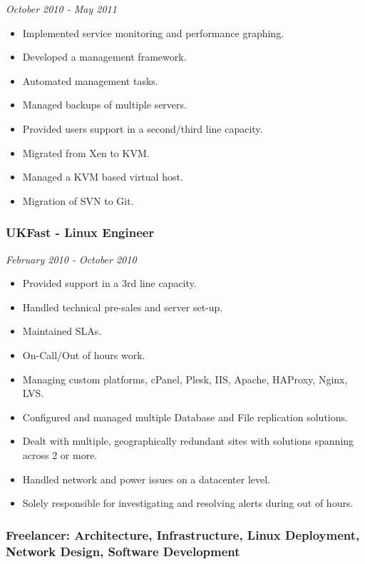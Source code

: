 \emph{October 2010 - May 2011}

\begin{itemize}
\itemsep1pt\parskip0pt
\item
  Implemented service monitoring and performance graphing.
\item
  Developed a management framework.
\item
  Automated management tasks.
\item
  Managed backups of multiple servers.
\item
  Provided users support in a second/third line capacity.
\item
  Migrated from Xen to KVM.
\item
  Managed a KVM based virtual host.
\item
  Migration of SVN to Git.
\end{itemize}

\subsubsection{UKFast - Linux Engineer}\label{ukfast---linux-engineer}

\emph{February 2010 - October 2010}

\begin{itemize}
\itemsep1pt\parskip0pt
\item
  Provided support in a 3rd line capacity.
\item
  Handled technical pre-sales and server set-up.
\item
  Maintained SLAs.
\item
  On-Call/Out of hours work.
\item
  Managing custom platforms, cPanel, Plesk, IIS, Apache, HAProxy, Nginx,
  LVS.
\item
  Configured and managed multiple Database and File replication
  solutions.
\item
  Dealt with multiple, geographically redundant sites with solutions
  spanning across 2 or more.
\item
  Handled network and power issues on a datacenter level.
\item
  Solely responsible for investigating and resolving alerts during out
  of hours.
\end{itemize}

\subsubsection{Freelancer: Architecture, Infrastructure, Linux
Deployment, Network Design, Software
Development}\label{freelancer-architecture-infrastructure-linux-deployment-network-design-software-development}

